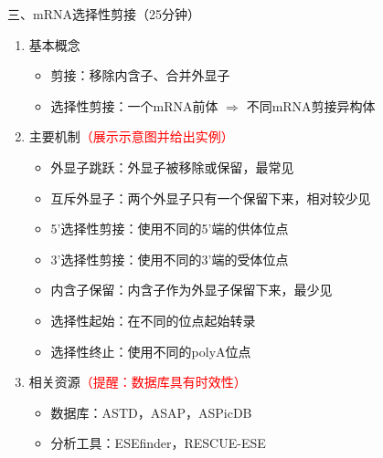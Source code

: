 \documentclass{TIJMUjiaoanLL}
\begin{document}
\noindent
三、mRNA选择性剪接（25分钟）
\begin{enumerate}
  \item 基本概念
    \begin{itemize}
      \item 剪接：移除内含子、合并外显子
      \item 选择性剪接：一个mRNA前体 $\Rightarrow$ 不同mRNA剪接异构体
    \end{itemize}
  \item 主要机制\textcolor{red}{（展示示意图并给出实例）}
    \begin{itemize}
      \item 外显子跳跃：外显子被移除或保留，最常见
      \item 互斥外显子：两个外显子只有一个保留下来，相对较少见
      \item 5'选择性剪接：使用不同的5'端的供体位点
      \item 3'选择性剪接：使用不同的3'端的受体位点
      \item 内含子保留：内含子作为外显子保留下来，最少见
      \item 选择性起始：在不同的位点起始转录
      \item 选择性终止：使用不同的polyA位点
    \end{itemize}
  \item 相关资源\textcolor{red}{（提醒：数据库具有时效性）}
    \begin{itemize}
      \item 数据库：ASTD，ASAP，ASPicDB
      \item 分析工具：ESEfinder，RESCUE-ESE
    \end{itemize}
\end{enumerate}

\otherTail
\newpage
\otherHeader
\end{document}
